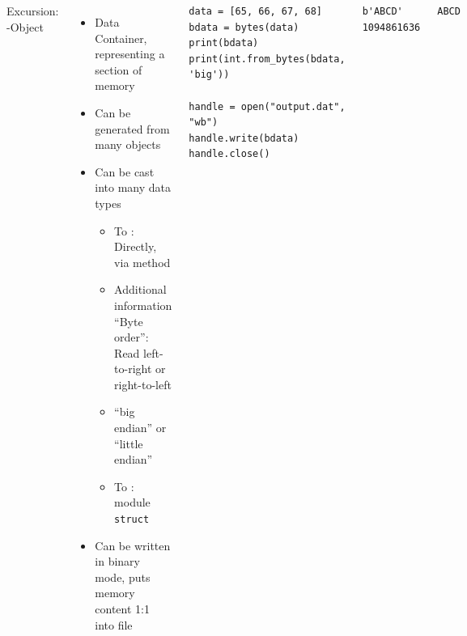 \begin{frame}[fragile]
%
\begin{columns}[T]
\begin{Large}
	{Excursion: -Object}
	\vspace{6pt}
\end{Large}
%
\begin{itemize}
\item Data Container, representing a section of memory
\item Can be generated from many objects
\item Can be cast into many data types
	\begin{itemize}
	\item To : Directly, via method 
	\item Additional information \enquote{Byte order}: Read left-to-right or right-to-left
	\item \enquote{big endian} or \enquote{little endian}
	\item To : module \texttt{struct}
	\end{itemize}
\item Can be written in binary mode, puts memory content 1:1 into file
\end{itemize}
%
\begin{codebox}
\begin{verbatim}
data = [65, 66, 67, 68]
bdata = bytes(data)
print(bdata)
print(int.from_bytes(bdata, 'big'))

handle = open("output.dat", "wb")
handle.write(bdata)
handle.close()
\end{verbatim}
\end{codebox}
%
\begin{cmdbox}
\begin{verbatim}
b'ABCD'
1094861636
\end{verbatim}
\end{cmdbox}
%
\begin{cmdbox}
\begin{verbatim}
ABCD
\end{verbatim}
\end{cmdbox}
\end{columns}
%
\end{frame}


